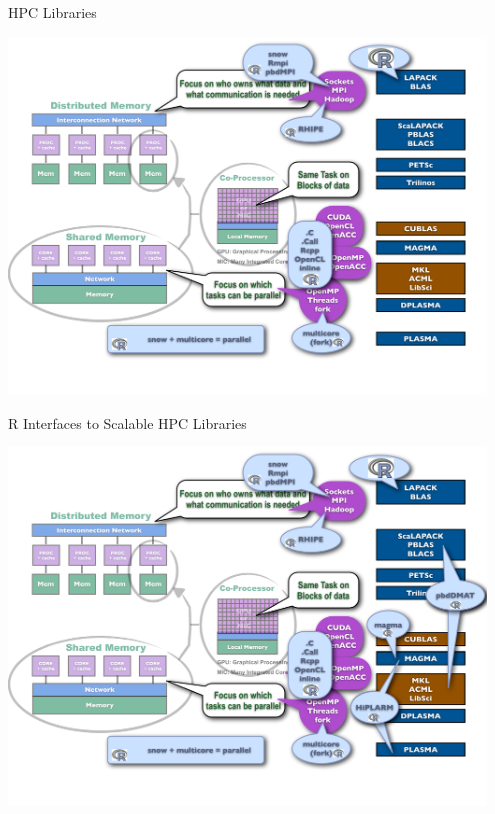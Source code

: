 \begin{frame}
\begin{block}{HPC Libraries}
    
\includegraphics[width=0.95\textwidth]
{../common/pics/hardware/ParallelHardware11.pdf}
\end{block}
\end{frame}

\begin{frame}
\begin{block}{R Interfaces to Scalable HPC Libraries}
    
\includegraphics[width=0.95\textwidth]
{../common/pics/hardware/ParallelHardware12.pdf}
\end{block}
\end{frame}

